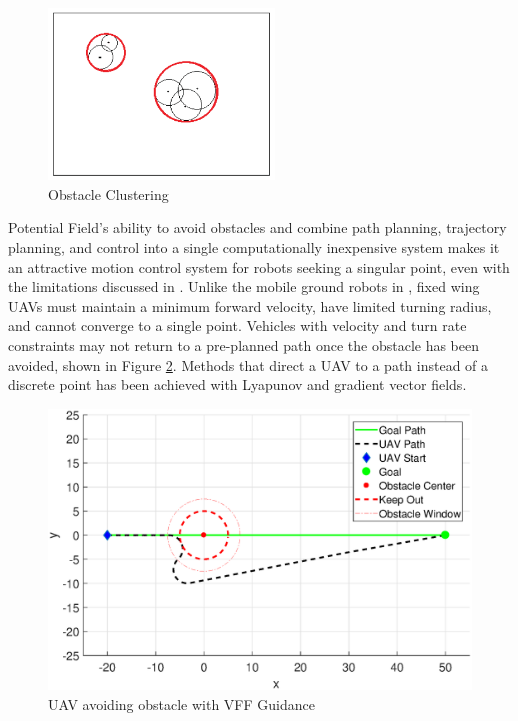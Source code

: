 \documentclass[numbered,pdftex]{ohio-etd}
\begin{document}
\begin{figure}[H]
	\centering
	\includegraphics[width=6cm]{PaperFigures/obstacleClustering}
	\caption{Obstacle Clustering \cite{liu_virtual-waypoint_2016}}
	\label{fig:obstacleclustering}
\end{figure}

Potential Field's ability to avoid obstacles and combine path planning, trajectory planning, and control into a single computationally inexpensive system makes it an attractive motion control system for robots seeking a singular point, even with the limitations discussed in \cite{koren_potential_1991}. Unlike the mobile ground robots in \cite{borenstein_real-time_1990}, fixed wing UAVs must maintain a minimum forward velocity, have limited turning radius, and cannot converge to a single point. Vehicles with velocity and turn rate constraints may not return to a pre-planned path once the obstacle has been avoided, shown in Figure \ref{fig:vffSimulated}. Methods that direct a UAV to a path instead of a discrete point has been achieved with Lyapunov and gradient vector fields. 


\begin{figure}[H]
	\centering
	\includegraphics[width=15cm]{PaperFigures/Literature/vffSimulated}
	\caption{UAV avoiding obstacle with VFF Guidance}
	\label{fig:vffSimulated}
\end{figure}
\end{document}
